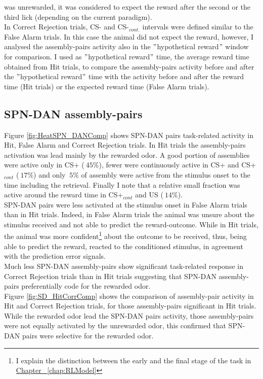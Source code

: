 was unrewarded, it was considered to expect the reward after the second or the third lick (depending on the current paradigm).\\In Correct Rejection trials, CS- and CS-$_{cont.}$ intervals were defined similar to the False Alarm trials. In this case the animal did not expect the reward, however, I analysed the assembly-pairs activity also in the $"$hypothetical reward$"$ window for comparison. I used as $"$hypothetical reward$"$ time, the average reward time obtained from Hit trials, to compare the assembly-pairs activity before and after the $"$hypothetical reward$"$ time with the activity before and after the reward time (Hit trials) or the expected reward time (False Alarm trials).
\subsection{SPN-DAN assembly-pairs}
Figure \ref{fig:HeatSPN_DANComp} shows SPN-DAN pairs task-related activity in Hit, False Alarm and Correct Rejection trials. In Hit trials the assembly-pairs activation was lead mainly by the rewarded odor. A good portion of assemblies were active only in CS+ ($~ 45\%$), fewer were continuously active in CS+ and CS+$_{cont}$ ($~17\%$) and only $~5\%$ of assembly were active from the stimulus onset to the time including the retrieval. Finally I note that a relative small fraction was active around the reward time in CS+$_{cont}$ and US ($~ 14\%$).\\SPN-DAN pairs were less activated at the stimulus onset in False Alarm trials than in Hit trials. Indeed, in False Alarm trials the animal was unsure about the stimulus received and not able to predict the reward-outcome. While in Hit trials, the animal was more confident\footnote{I explain the distinction between the early and the final stage of the task in \hyperref[chap:RLModel]{Chapter ~\ref*{chap:RLModel}}} about the outcome to be received, thus, being able to predict the reward, reacted to the conditioned stimulus, in agreement with the prediction error signals.\\
Much less SPN-DAN assembly-pairs show significant task-related response in Correct Rejection trials than in Hit trials suggesting that SPN-DAN assembly-pairs preferentially code for the rewarded odor.\\Figure \ref{fig:SD_HitCorrComp} shows the comparison of assembly-pair activity in Hit and Correct Rejection trials, for those assembly-pairs significant in Hit trials. While the rewarded odor lead the SPN-DAN pairs activity, those assembly-pairs were not equally activated by the unrewarded odor, this confirmed that SPN-DAN pairs were selective for the rewarded odor.
